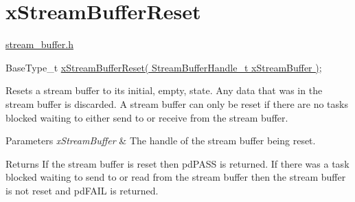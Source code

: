 \hypertarget{group__x_stream_buffer_reset}{}\section{x\+Stream\+Buffer\+Reset}
\label{group__x_stream_buffer_reset}
\hyperlink{stream__buffer_8h}{stream\+\_\+buffer.\+h}


\begin{DoxyPre}
BaseType\_t \hyperlink{stream__buffer_8h_a5253429645c67902c2fc8682f8af0aac}{xStreamBufferReset( StreamBufferHandle\_t xStreamBuffer )};
\end{DoxyPre}


Resets a stream buffer to its initial, empty, state. Any data that was in the stream buffer is discarded. A stream buffer can only be reset if there are no tasks blocked waiting to either send to or receive from the stream buffer.


\begin{DoxyParams}{Parameters}
{\em x\+Stream\+Buffer} & The handle of the stream buffer being reset.\\
\hline
\end{DoxyParams}
\begin{DoxyReturn}{Returns}
If the stream buffer is reset then pd\+P\+A\+SS is returned. If there was a task blocked waiting to send to or read from the stream buffer then the stream buffer is not reset and pd\+F\+A\+IL is returned. 
\end{DoxyReturn}
